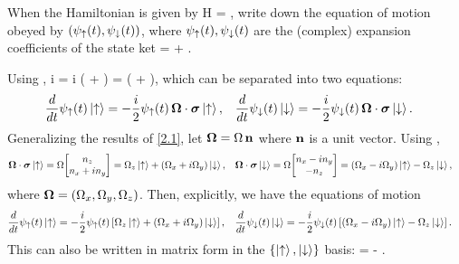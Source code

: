 \newcommand{\vaa}{\vec{a}}
\newcommand{\vbb}{\vec{b}}
\newcommand{\costt}{\cos{\frac{t}{2}}}
\newcommand{\sintt}{\sin{\frac{t}{2}}}

\begin{problem}
	When the Hamiltonian is given by
	\beqn \label{ham3}
		H =  \Ods,
	\eeqn
	write down the equation of motion obeyed by $(\psi_\uparrow(t), \psi_\downarrow(t))$, where $\psi_\uparrow(t), \psi_\downarrow(t)$ are the (complex) expansion coefficients of the state ket
	\beq
		\kpsit = \psiut \kup + \psidt \kdn.
	\eeq
\vfix
\end{problem}

\begin{solution}
	Using ,
	\beq
		i \hbar {} \kpsit =  \Ods \kpsit
		\iff
		i \hbar {} \left( \psiut \kup + \psidt \kdn \right) =  \Ods \left( \psiut \kup + \psidt \kdn \right),
	\eeq
	which can be separated into two equations:
	\begin{align}
		\dv{}{t} \psi_\uparrow(t) \ket{\uparrow} &= -\frac{i}{2} \psi_\uparrow(t) \, \boldsymbol{\Omega} \cdot \boldsymbol{\sigma} \ket{\uparrow}, &
		\dv{}{t} \psi_\downarrow(t) \ket{\downarrow} &= -\frac{i}{2} \psi_\downarrow(t) \, \boldsymbol{\Omega} \cdot \boldsymbol{\sigma} \ket{\downarrow}.
	\end{align}
	Generalizing the results of \ref{2.1}, let $\boldsymbol{\Omega} = \Omega \, \mathbf{n}$ where $\mathbf{n}$ is a unit vector.  Using ,
	\begin{align*}
		\Ods \kup &= \Omega \mqty[ \nz \\ \nx + i \ny ] = \Omz \kup + (\Omx + i \Omy) \kdn, &
		\Ods \kdn &= \Omega \mqty[ \nx - i \ny \\ -\nz ] = (\Omx - i \Omy) \kup - \Omz \kdn,
	\end{align*}
	where $\boldsymbol{\Omega} = (\Omega_x, \Omega_y, \Omega_z)$.  Then, explicitly, we have the equations of motion
	\begin{align}
		\dv{}{t} \psi_\uparrow(t) \ket{\uparrow} &= -\frac{i}{2} \psi_\uparrow(t) \left[ \Omega_z \ket{\uparrow} + (\Omega_x + i \Omega_y) \ket{\downarrow} \right], &
		\dv{}{t} \psi_\downarrow(t) \ket{\downarrow} &= -\frac{i}{2} \psi_\downarrow(t) \left[ (\Omega_x - i \Omega_y) \ket{\uparrow} - \Omega_z \ket{\downarrow} \right].
	\end{align}
	This can also be written in matrix form in the $\{ \ket{\uparrow}, \ket{\downarrow} \}$ basis:
	\beq
		 \mqty[ \psiut \\ \psidt ] = -  \mqty[ \psiut \\ \psidt ].
	\eeq
\vfix
\end{solution}

\newcommand{\sigi}{\sig_i}
\newcommand{\sigj}{\sig_j}
\newcommand{\sigk}{\sig_k}
\newcommand{\lct}{\varepsilon_{ijk}}
\newcommand{\Sq}{S_1}
\newcommand{\Sw}{S_2}
\newcommand{\Se}{S_3}
\newcommand{\Si}{S_i}
\newcommand{\Omq}{\Omega_1}
\newcommand{\Omw}{\Omega_2}
\newcommand{\Ome}{\Omega_3}
\newcommand{\Omj}{\Omega_j}

